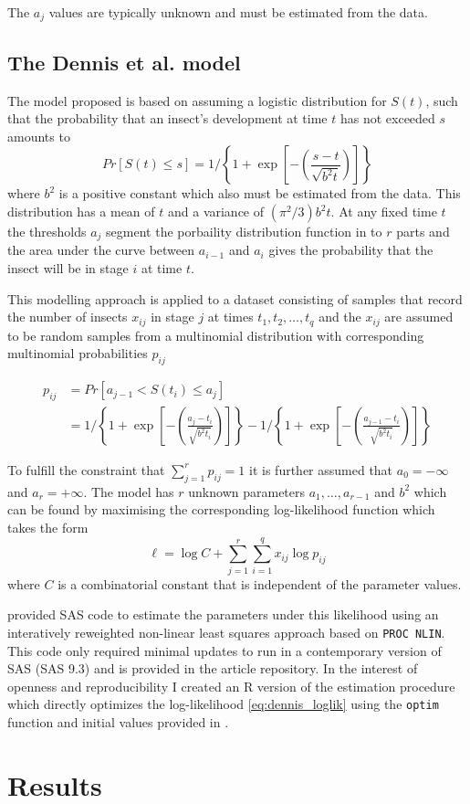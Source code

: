 The $a_j$ values are typically unknown and must be estimated from the data.

\subsection{The Dennis et al. model}
The model \citet{dennis1986stochastic} proposed is based on assuming a logistic distribution for $S(t)$, such that the probability that an insect's development at time $t$ has not exceeded $s$ amounts to 
\begin{equation}
Pr[S(t) \leq s] = 1 \bigg/ \left\{ 1 + \exp\left[-\left(\frac{s-t}{\sqrt{b^2t}}\right)\right]\right\}
\end{equation}
where $b^2$ is a positive constant which also must be estimated from the data. This distribution has a mean of $t$ and a variance of $(\pi^2/3)b^2t$.
At any fixed time $t$ the thresholds $a_j$ segment the porbaility distribution function in to $r$ parts and the area under the curve between $a_{i-1}$ and $a_i$ gives the probability that the insect will be in stage $i$ at time $t$.

This modelling approach is applied to a dataset consisting of samples that record the number of insects $x_{ij}$ in stage $j$ at times $t_1, t_2, \dots, t_q$ and the $x_{ij}$ are assumed to be random samples from a multinomial distribution with corresponding multinomial probabilities $p_{ij}$

\begin{align}
p_{ij} & = Pr[a_{j-1} < S(t_i) \leq a_{j}]\\
& = 1 \bigg/ \left\{ 1 + \exp\left[-\left(\frac{a_j-t_i}{\sqrt{b^2t_i}}\right)\right]\right\} - 1 \bigg/ \left\{ 1 + \exp\left[-\left(\frac{a_{j-1}-t_i}{\sqrt{b^2t_i}}\right)\right]\right\}
\end{align}

To fulfill the constraint that $\sum_{j=1}^r p_{ij}= 1$ it is further assumed that $a_0 = -\infty$ and $a_r = +\infty$.
The model has $r$ unknown parameters $a_1, \dots, a_{r-1}$ and $b^2$ which can be found by maximising the corresponding log-likelihood function which takes the form 
\begin{equation}
\mathcal{\ell} = \log C + \sum_{j=1}^r \sum_{i=1}^q x_{ij} \log p_{ij}
\label{eq:dennis_loglik}
\end{equation}
where $C$ is a combinatorial constant that is independent of the parameter values.

\citet{dennis1986stochastic} provided SAS code to estimate the parameters under this likelihood using an interatively reweighted non-linear least squares approach based on \verb+PROC NLIN+. This code only required minimal updates to run in a contemporary version of SAS (SAS 9.3) and is provided in the article repository. In the interest of openness and reproducibility I created an R version of the estimation procedure which directly optimizes the log-likelihood \ref{eq:dennis_loglik} using the \verb+optim+ function and initial values provided in \citep{dennis1986stochastic}.

\citet{dennis1986stochastic}

\section{Results}